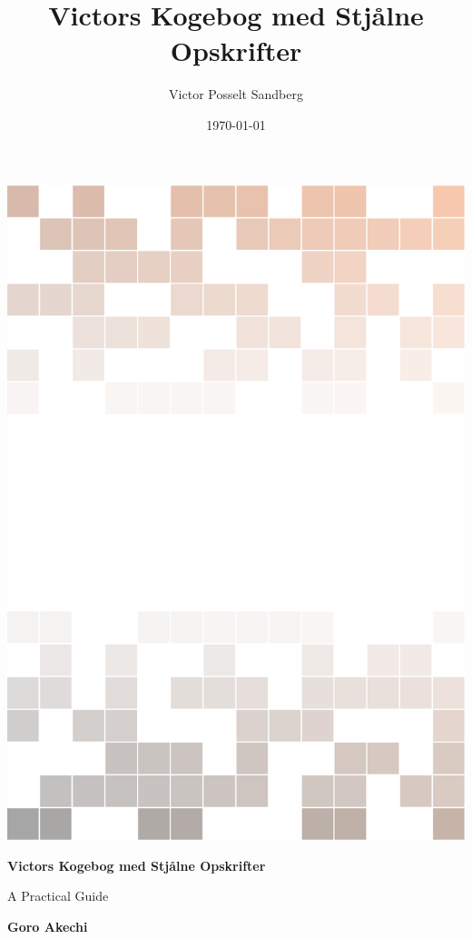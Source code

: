 \documentclass{book}
\title{Victors Kogebog med Stjålne Opskrifter}
\author{Victor Posselt Sandberg}
\date{\today}
\begin{document}
\dominitoc  

\frontmatter
\titlepage %
	{\includegraphics[width=\paperwidth]{background.pdf} %
	{ %
		\centering\sffamily %
		{\Huge\bfseries Victors Kogebog med Stjålne Opskrifter\par} %
		\vspace{16pt} %
		{\LARGE A Practical Guide\par} %
		\vspace{24pt} %
		{\huge\bfseries Goro Akechi\par} %
	}

}
\end{document}
